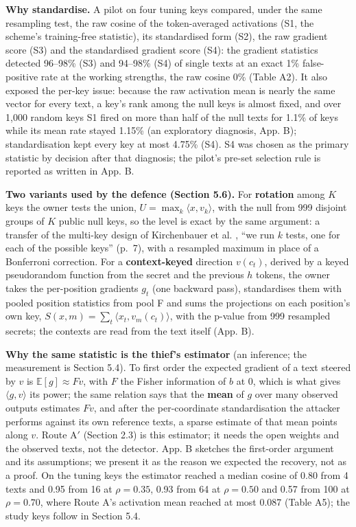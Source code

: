 \documentclass[11pt,letterpaper]{article}
\begin{document}
\textbf{Why standardise.} A pilot on four tuning keys compared, under the same resampling test, the raw cosine of the token-averaged activations (S1, the scheme's training-free statistic), its standardised form (S2), the raw gradient score (S3) and the standardised gradient score (S4): the gradient statistics detected 96--98\% (S3) and 94--98\% (S4) of single texts at an exact 1\% false-positive rate at the working strengths, the raw cosine 0\% (Table A2). It also exposed the per-key issue: because the raw activation mean is nearly the same vector for every text, a key's rank among the null keys is almost fixed, and over 1,000 random keys S1 fired on more than half of the null texts for 1.1\% of keys while its mean rate stayed 1.15\% (an exploratory diagnosis, App. B); standardisation kept every key at most 4.75\% (S4). S4 was chosen as the primary statistic by decision after that diagnosis; the pilot's pre-set selection rule is reported as written in App. B.

\textbf{Two variants used by the defence (Section 5.6).} For \textbf{rotation} among \(K\) keys the owner tests the union, \(U = \max_k \langle x, v_k \rangle\), with the null from 999 disjoint groups of \(K\) public null keys, so the level is exact by the same argument: a transfer of the multi-key design of Kirchenbauer et al. \citep{kirchenbauer2023watermark}, ``we run \(k\) tests, one for each of the possible keys'' (p.~7), with a resampled maximum in place of a Bonferroni correction. For a \textbf{context-keyed} direction \(v(c_t)\), derived by a keyed pseudorandom function from the secret and the previous \(h\) tokens, the owner takes the per-position gradients \(g_t\) (one backward pass), standardises them with pooled position statistics from pool F and sums the projections on each position's own key, \(S(x, m) = \sum_t \langle x_t, v_m(c_t) \rangle\), with the p-value from 999 resampled secrets; the contexts are read from the text itself (App. B).

\textbf{Why the same statistic is the thief's estimator} (an inference; the measurement is Section 5.4). To first order the expected gradient of a text steered by \(v\) is \(\mathbb{E}[g] \approx F v\), with \(F\) the Fisher information of \(b\) at 0, which is what gives \(\langle g, v \rangle\) its power; the same relation says that the \textbf{mean} of \(g\) over many observed outputs estimates \(F v\), and after the per-coordinate standardisation the attacker performs against its own reference texts, a sparse estimate of that mean points along \(v\). Route A\ensuremath{'} (Section 2.3) is this estimator; it needs the open weights and the observed texts, not the detector. App. B sketches the first-order argument and its assumptions; we present it as the reason we expected the recovery, not as a proof. On the tuning keys the estimator reached a median cosine of 0.80 from 4 texts and 0.95 from 16 at \(\rho = 0.35\), 0.93 from 64 at \(\rho = 0.50\) and 0.57 from 100 at \(\rho = 0.70\), where Route A's activation mean reached at most 0.087 (Table A5); the study keys follow in Section 5.4.
\end{document}
